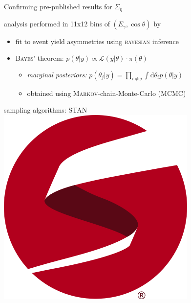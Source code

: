 \documentclass[11pt,aspectratio=169,dvipsnames]{beamer}
\newcommand{\thecolor}{black!70!blue}
\begin{document}
\begin{frame}[noframenumbering]{Confirming pre-published results for $\Sigma_\eta$}
	\begin{minipage}{\linewidth}
\begin{tcolorbox}[colback=blue!5,colframe=\thecolor,title={Event selection ($\eta$)}]
	analysis performed in 11x12 bins of $(E_\gamma,\cos\theta)$ by \cites{eta}
\end{tcolorbox}
	\end{minipage}
	\begin{minipage}{\linewidth}
\begin{tcolorbox}[colback=blue!5,colframe=\thecolor,title={Method}]
	\begin{itemize}
		\item fit to event yield asymmetries using \textsc{bayesian} inference
		\item \textsc{Bayes'} theorem: $p(\theta|y)\propto\mathcal{L}(y|\theta)\cdot\pi(\theta)$
		\begin{itemize}
			\item \emph{marginal posteriors:} $p(\theta_j|y)=\prod_{i\neq j}\int\text{d}\theta_i p(\theta|y)$
			\item obtained using \textsc{Markov}-chain-Monte-Carlo (MCMC)

		\end{itemize} 
	\end{itemize}
\begin{flushright}
	sampling algorithms: STAN \includegraphics[width=.1\linewidth]{figs/logo-tm.png}\\
	\cites{stan}
\end{flushright}
\end{tcolorbox}
\end{minipage}

\end{frame}
\end{document}
